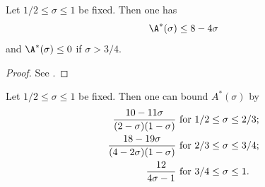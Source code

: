 \begin{proposition}\label{zeroe-lindelof}  Let $1/2 \leq \sigma \leq 1$ be fixed.  Then one has
    $$ \A^*(\sigma) \leq 8 - 4\sigma$$
    and $\A^*(\sigma) \leq 0$ if $\sigma > 3/4$.
\end{proposition}

\begin{proof} See \cite[Lemma 4]{heath_brown_consecutive_II}.
\end{proof}

\begin{theorem}\label{hb-energy-bound}\cite[Theorem 2]{heathbrown_zero_1979}  Let $1/2 \leq \sigma \leq 1$ be fixed.  Then one can bound $A^*(\sigma)$ by
    \begin{align*}
        \frac{10-11\sigma}{(2-\sigma)(1-\sigma)} & \hbox{ for } 1/2 \leq \sigma \leq 2/3;\\
        \frac{18-19\sigma}{(4-2\sigma)(1-\sigma)} & \hbox{ for } 2/3 \leq \sigma \leq 3/4;\\
        \frac{12}{4\sigma-1} & \hbox{ for } 3/4 \leq \sigma \leq 1.
    \end{align*}
\end{theorem}

\literature
{}
\derived
{}

